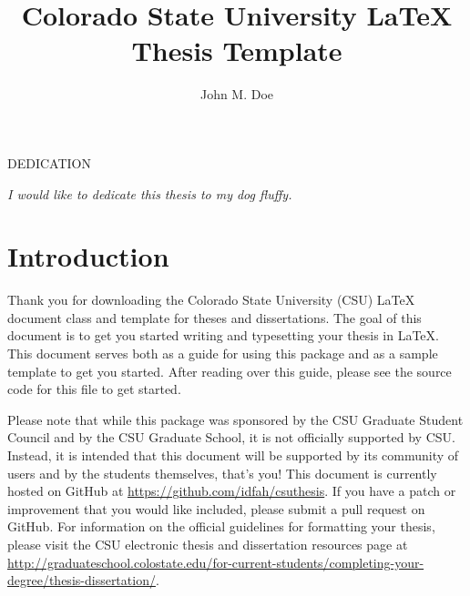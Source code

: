 \documentclass[master]{thesis}
\title{Colorado State University LaTeX Thesis Template}
\author{John M. Doe}
\begin{document}

\frontmatter %

\maketitle
\makemycopyright
\makeabstract
\makeacknowledgements
\tableofcontents

\begin{center}

    DEDICATION

    \vfill %
    \noindent \textit{I would like to dedicate this thesis to my dog fluffy.}
    \vfill
\end{center}
\newpage

\mainmatter %

\chapter{Introduction}
\label{chap:intro}

Thank you for downloading the Colorado State University (CSU) \LaTeX{} document class and template for theses and dissertations.  The goal of this document is to get you started writing and typesetting your thesis in \LaTeX{}.  This document serves both as a guide for using this package and as a sample template to get you started.  After reading over this guide, please see the source code for this file to get started.

Please note that while this package was sponsored by the CSU Graduate Student Council and by the CSU Graduate School, it is not officially supported by CSU.  Instead, it is intended that this document will be supported by its community of users and by the students themselves, that's you!  This document is currently hosted on GitHub at \url{https://github.com/idfah/csuthesis}.  If you have a patch or improvement that you would like included, please submit a pull request on GitHub.  For information on the official guidelines for formatting your thesis, please visit the CSU electronic thesis and dissertation resources page at \url{http://graduateschool.colostate.edu/for-current-students/completing-your-degree/thesis-dissertation/}.
\end{document}
